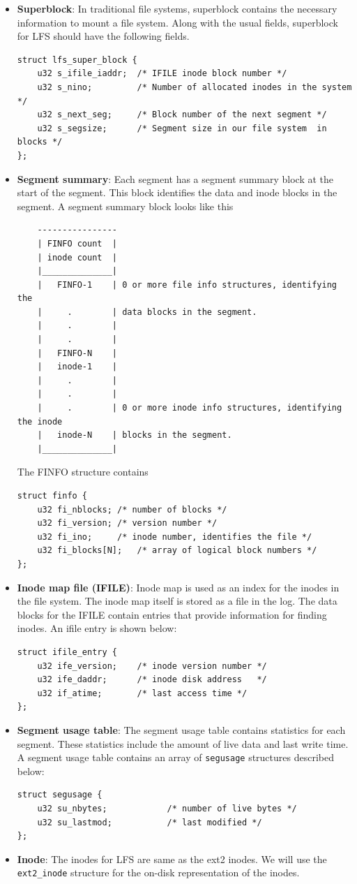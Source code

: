 \documentclass{article}
\begin{document}
\begin{itemize}
\item
\textbf{Superblock}: In traditional file systems, superblock contains the
necessary information to mount a file system. Along with the usual fields,
superblock for LFS should have the following fields.
\begin{verbatim}
struct lfs_super_block {
    u32 s_ifile_iaddr;  /* IFILE inode block number */
    u32 s_nino;	        /* Number of allocated inodes in the system */
    u32 s_next_seg;     /* Block number of the next segment */
    u32 s_segsize;      /* Segment size in our file system  in blocks */
};
\end{verbatim}
\item
\textbf{Segment summary}: Each segment has a segment summary block at the
start of the segment. This block identifies the data and inode blocks in the
segment. A segment summary block looks like this
\begin{verbatim}
    ----------------
    | FINFO count  |
    | inode count  |
    |______________|
    |   FINFO-1    | 0 or more file info structures, identifying the
    |     .        | data blocks in the segment.
    |     .        |
    |     .        |
    |   FINFO-N    |
    |   inode-1    |
    |     .        |
    |     .        |
    |     .        | 0 or more inode info structures, identifying the inode
    |   inode-N    | blocks in the segment.
    |______________|
\end{verbatim}
The FINFO structure contains
\begin{verbatim}
struct finfo {
    u32 fi_nblocks;	/* number of blocks */
    u32 fi_version;	/* version number */
    u32 fi_ino;		/* inode number, identifies the file */
    u32 fi_blocks[N];	/* array of logical block numbers */
};
\end{verbatim}
\item
\textbf{Inode map file (IFILE)}: Inode map is used as an index for the inodes
in the file system. The inode map itself is stored as a file in the log. The
data blocks for the IFILE contain entries that provide information for finding
inodes. An ifile entry is shown below:
\begin{verbatim}
struct ifile_entry {
    u32 ife_version; 	/* inode version number */
    u32 ife_daddr;	    /* inode disk address	*/
    u32 if_atime;		/* last access time	*/
};
\end{verbatim}
\item
\textbf{Segment usage table}: The segment usage table contains statistics for
each segment. These statistics include the amount of live data and last write
time. A segment usage table contains an array of \texttt{segusage}
structures described below:
\begin{verbatim}
struct segusage {
    u32 su_nbytes;            /* number of live bytes */
    u32 su_lastmod;           /* last modified */
};
\end{verbatim}
\item
\textbf{Inode}: The inodes for LFS are same as the ext2 inodes. We will use
the \texttt{ext2\_inode} structure for the on-disk representation of the
inodes.
\end{itemize}
\end{document}

